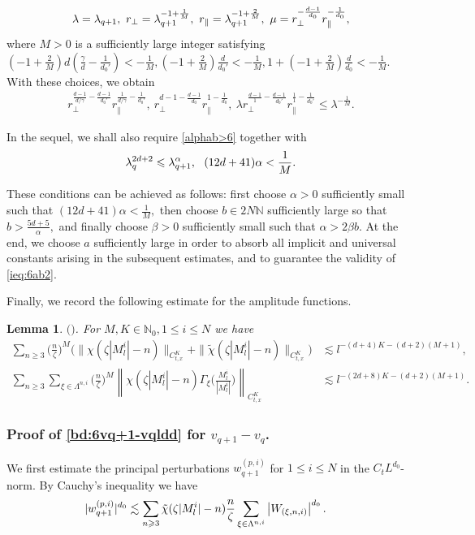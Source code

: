 \documentclass[UTF-8,reqno]{amsart}
\numberwithin{equation}{section}
\newtheorem{lemma}[theorem]{Lemma}
\theoremstyle{definition}
\def\({{\Big(}}
\def\){{\Big)}}
\newcommand{\norm}[1]{\left\|#1\right\|}
\def\geq{\geqslant}
\def\leq{\leqslant}
\def\({{\Big(}}
\def\){{\Big)}}
\def\bl{\begin{lemma}}
\def\el{\end{lemma}}
\def\geq{\geqslant}
\def\leq{\leqslant}
\begin{document}
\begin{align}
  \lambda=\lambda_{q+1},\ r_\perp=\lambda_{q+1}^{-1+\frac1{M}},\ r_\parallel=\lambda_{q+1}^{-1+\frac2{M}},\   \mu=r_\perp^{-\frac{d-1}{d_0}}r_\parallel^{-\frac1{d_0}}, \notag
\end{align}
where $M>0$ is a sufficiently large integer satisfying $(-1+\frac2M)d(\frac{\gamma}{d}-\frac{1}{d_0'})<-\frac1M,(-1+\frac2M)\frac{d}{d_0'}<-\frac1M,1+(-1+\frac2M)\frac{d}{d_0}<-\frac1M$.  
With these choices,  we obtain
\begin{align}
  r_\perp^{\frac{d-1}{d/\gamma}-\frac{d-1}{d_0'}} r_\parallel^{\frac1{d/\gamma}-\frac{1}{d_0'}},\    r_\perp^{ d-1 -\frac{d-1}{d_0}} r_\parallel^{1-\frac{1}{d_0}},\ \lambda r_\perp^{\frac{d-1}{1}-\frac{d-1}{d_0'}} r_\parallel^{\frac{1}{1}-\frac{1}{d_0'}}\leq\lambda^{-\frac1M}.\label{bd:paralam6}
\end{align}
 
 

In the sequel, we shall also require \eqref{alphab>6} together with \begin{align}
   \lambda_{q}^{2d+2}\leq\lambda_{q+1}^\alpha,\ \ (12d+41)\alpha<\frac1{M}.\notag
 \end{align} 
 
These conditions can be achieved as follows:
first choose $\alpha>0$ sufficiently small such that
$
(12d+41)\alpha<\frac1{M},
$
then choose
$
b\in2N\mathbb{N}
$
sufficiently large so that
$
b>\frac{5d+5}{\alpha},
$
and finally choose $\beta>0$ sufficiently small such that
$
\alpha>2\beta b.
$
At the end, we choose $a$ sufficiently large in order to absorb all implicit and universal constants arising in the subsequent estimates, and to guarantee the validity of \eqref{ieq:6ab2}.


Finally, we record the following estimate for the amplitude functions.

\bl\label{lem:6chi}$($\cite[Proposition 5.2]{LRZ25}$)$.
 For $ M,K\in\mathbb{N}_0,1\leq i\leq N$  we have
\begin{align*}
    \sum_{n\geq3} \(\frac{n}{\zeta}\)^M\(\|\chi(\zeta|M^{i}_l|-n)\|_{C_{t,x}^K}+ \|\tilde{\chi}(\zeta|M^{i}_l|-n)\|_{C_{t,x}^K}\)&\lesssim l^{- (d+4)K-(d+2)(M+1)},\\
     \sum_{n\geq3}\sum_{\xi\in\Lambda^{n,i}}\(\frac{n}{\zeta}\)^M\norm{\chi(\zeta|M^{i}_l|-n)\Gamma_\xi\(\frac{M^{i}_l}{|M^{i}_l|}\)}_{C_{t,x}^K}& \lesssim l^{-(2d+8)K-(d+2)(M+1)}.
\end{align*}
\el 

\subsubsection{Proof of  \eqref{bd:6vq+1-vqldd}  for $v_{q+1}-v_q$.}
We first estimate the principal perturbations $w_{q+1}^{(p,i)}$ for   $1\leq i\leq N $ in the $C_tL^{d_0}$-norm. By Cauchy's inequality    we have
\begin{align}
|w_{q+1}^{(p,i)}|^{d_0} 
&\lesssim \sum_{n\geq3}\tilde{\chi}(\zeta|M^{i}_l|-n)\frac{n}{\zeta}\sum_{\xi\in\Lambda^{n,i}}\left|W_{(\xi,n,i)} \right|^{d_0}.\notag
\end{align} 
\end{document}
